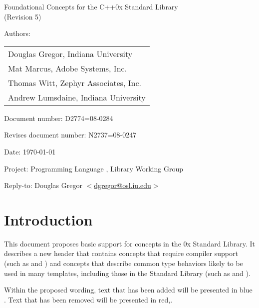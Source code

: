 \documentclass[american,twoside]{book}
\begin{document}
\raggedbottom

\begin{titlepage}
\begin{center}
\huge
Foundational Concepts for the C++0x Standard Library\\
(Revision 5)
\vspace{0.25in}
\end{center}

\normalsize
\vspace{0.25in}
\par\noindent Authors: 
\begin{tabular}[t]{l}
Douglas Gregor, Indiana University \\
Mat Marcus, Adobe Systems, Inc.\\
Thomas Witt, Zephyr Associates, Inc.\\
Andrew Lumsdaine, Indiana University
\end{tabular}\vspace{-6pt}

\par\noindent Document number: D2774=08-0284\vspace{-6pt}
\par\noindent Revises document number: N2737=08-0247\vspace{-6pt}
\par\noindent Date: \today\vspace{-6pt}
\par\noindent Project: Programming Language \Cpp{}, Library Working Group\vspace{-6pt}
\par\noindent Reply-to: Douglas Gregor $<$\href{mailto:dgregor@osl.iu.edu}{dgregor@osl.iu.edu}$>$\vspace{-6pt}

\section*{Introduction}
This document proposes basic support for concepts in the \Cpp0x
Standard Library. It describes a new header  that
contains concepts that require compiler support (such as
 and ) and concepts that describe
common type behaviors likely to be used in many templates, including
those in the Standard Library (such as  and
). 

Within the proposed wording, text that has been added
\textcolor{addclr}{will be presented in blue} . Text that has been removed will be
presented \textcolor{remclr}{in red},.


\end{titlepage}
\end{document}
